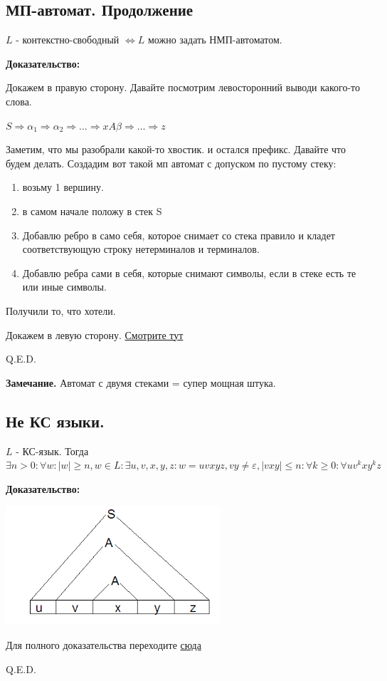 \subsection{МП-автомат. Продолжение}


$L$ - контекстно-свободный $\Leftrightarrow L$ можно задать НМП-автоматом.

\textbf{Доказательство:}

Докажем в правую сторону. Давайте посмотрим левосторонний выводи какого-то слова.

$S \Rightarrow \alpha_1 \Rightarrow \alpha_2 \Rightarrow \ldots \Rightarrow x A \beta \Rightarrow\ldots \Rightarrow z$

Заметим, что мы разобрали какой-то хвостик. и остался префикс. Давайте что будем делать. Создадим вот такой мп автомат с допуском по пустому стеку:

\begin{enumerate}
    \item возьму 1 вершину.
    \item в самом начале положу в стек S
    \item Добавлю ребро в само себя, которое снимает со стека правило и кладет соответствующую строку нетерминалов и терминалов.
    \item Добавлю ребра сами в себя, которые снимают символы, если в стеке есть те или иные символы.
\end{enumerate}
Получили то, что хотели.


Докажем в левую сторону. \href{https://clck.ru/3LyoXX}{Смотрите тут}

\hfill Q.E.D.


\textbf{Замечание.} Автомат с двумя стеками = супер мощная штука. 


\subsection{Не КС языки.}


$L$ - КС-язык. Тогда $\exists n > 0: \forall w: |w|\geq n, w \in L: \exists u,v,x,y,z: w= uvxyz, vy \neq \varepsilon, |vxy|\leq n: \forall k \geq 0: \forall uv^kxy^kz$

\textbf{Доказательство:}

\begin{center}
   \includegraphics[width=8cm]{assets/13_2_1.png}
\end{center}

Для полного доказательства переходите  \href{https://clck.ru/3LyofA}{сюда}

\hfill Q.E.D.


